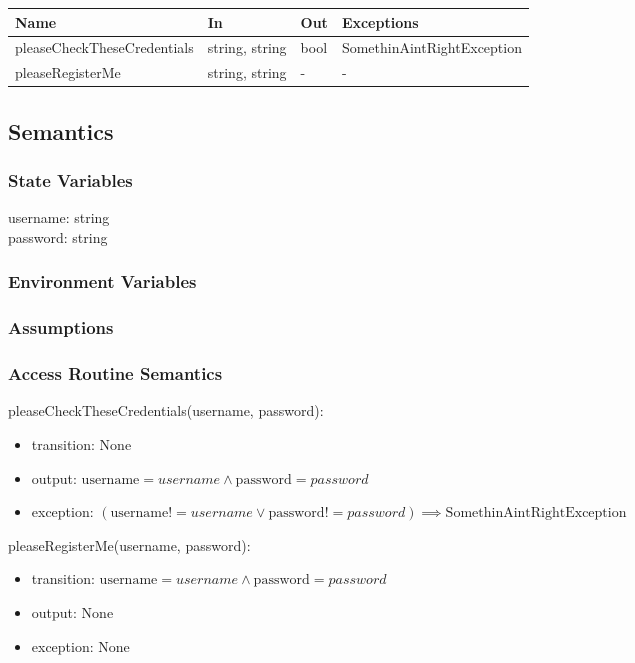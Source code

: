 \documentclass[12pt, titlepage]{article}
\begin{document}
\begin{center}
\begin{tabular}{p{6cm} p{3cm} p{1cm} p{5cm}}
\hline
\textbf{Name} & \textbf{In} & \textbf{Out} & \textbf{Exceptions} \\
\hline
pleaseCheckTheseCredentials & string, string & bool & SomethinAintRightException \\
pleaseRegisterMe & string, string & - & - \\
\hline
\end{tabular}
\end{center}

\subsection{Semantics}

\subsubsection{State Variables}
  
username: string \\
password: string

\subsubsection{Environment Variables}

\subsubsection{Assumptions}

\subsubsection{Access Routine Semantics}

\noindent pleaseCheckTheseCredentials(username, password):
\begin{itemize}
\item transition: None 
\item output: $\text{username} = username \land \text{password} = password$
\item exception: $(\text{username} != username \lor \text{password} != password) \implies \text{SomethinAintRightException}$
\end{itemize}

\noindent pleaseRegisterMe(username, password):
\begin{itemize}
\item transition: $\text{username} = username \land \text{password} = password$ 
\item output: None
\item exception: None
\end{itemize}
\end{document}

